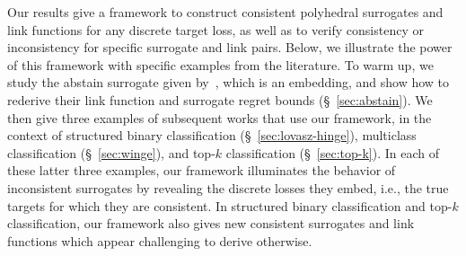 \documentclass[twoside,11pt]{article}
\newcommand{\Comments}{1}
\newcommand{\mynote}[2]{\ifnum\Comments=1\textcolor{#1}{#2}\fi}
\newcommand{\jessie}[1]{\mynote{teal}{[JF: #1]}}
\newcommand{\reals}{\mathbb{R}}
\newcommand{\prop}[1]{\mathrm{prop}[#1]}
\newcommand{\Sc}{\mathcal{S}}
\newcommand{\Y}{\mathcal{Y}}
\begin{document}
Our results give a framework to construct consistent polyhedral surrogates and link functions for any discrete target loss, as well as to verify consistency or inconsistency for specific surrogate and link pairs.
Below, we illustrate the power of this framework with specific examples from the literature.
To warm up, we study the abstain surrogate given by~\citet{ramaswamy2018consistent}, which is an embedding, and show how to rederive their link function and surrogate regret bounds (\S~\ref{sec:abstain}). 
We then give three examples of subsequent works that use our framework, in the context of structured binary classification (\S~\ref{sec:lovasz-hinge}), multiclass classification (\S~\ref{sec:winge}), and top-$k$ classification (\S~\ref{sec:top-k}).
In each of these latter three examples, our framework illuminates the behavior of inconsistent surrogates by revealing the discrete losses they embed, i.e., the true targets for which they are consistent.
In structured binary classification and top-$k$ classification, our framework also gives new consistent surrogates and link functions which appear challenging to derive otherwise.

\end{document}
